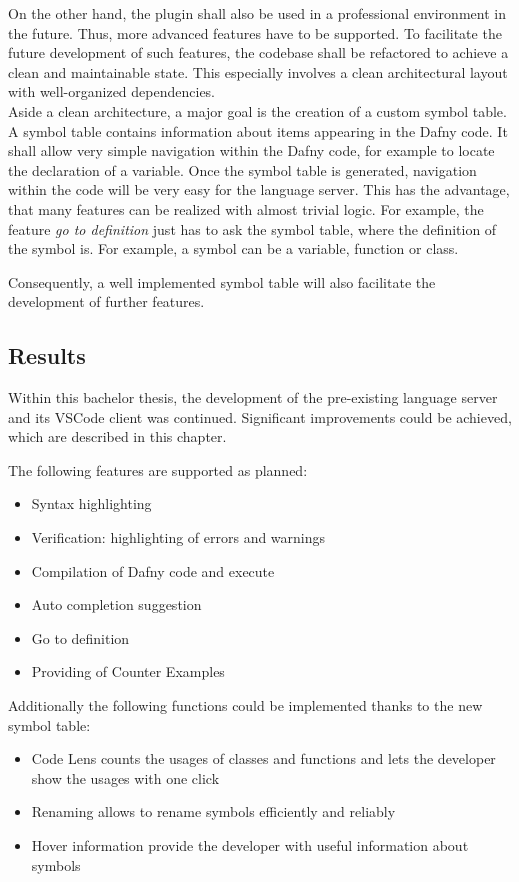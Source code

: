 On the other hand, the plugin shall also be used in a professional environment in the future.
Thus, more advanced features have to be supported.
To facilitate the future development of such features, the codebase shall be refactored to achieve a clean and maintainable state.
This especially involves a clean architectural layout with well-organized dependencies.\\

Aside a clean architecture, a major goal is the creation of a custom symbol table.
A symbol table contains information about items appearing in the Dafny code.
It shall allow very simple navigation within the Dafny code, for example to locate the declaration of a variable.
Once the symbol table is generated, navigation within the code will be very easy for the language server.
This has the advantage, that many features can be realized with almost trivial logic.
For example, the feature \textit{go to definition} just has to ask the symbol table, where the definition of the symbol is.
For example, a symbol can be a variable, function or class.

Consequently, a well implemented symbol table will also facilitate the development of further features.

\subsection{Results}
Within this bachelor thesis, the development of the pre-existing language server and its VSCode client was continued.
Significant improvements could be achieved, which are described in this chapter.

The following features are supported as planned:
\begin{itemize}
    \item Syntax highlighting
    \item Verification: highlighting of errors and warnings
    \item Compilation of Dafny code and execute
    \item Auto completion suggestion
    \item Go to definition
    \item Providing of Counter Examples
\end{itemize}

Additionally the following functions could be implemented thanks to the new symbol table:
\begin{itemize}
    \item Code Lens counts the usages of classes and functions and lets the developer show the usages with one click
    \item Renaming allows to rename symbols efficiently and reliably
    \item Hover information provide the developer with useful information about symbols
\end{itemize}

